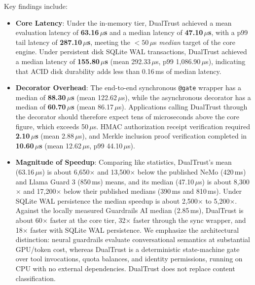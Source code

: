 \documentclass[manuscript, screen, review]{jair}
\begin{document}
Key findings include:
\begin{itemize}[leftmargin=12pt, topsep=2pt, itemsep=1pt]
\item \textbf{Core Latency}: Under the in-memory tier, DualTrust achieved a mean evaluation latency of \textbf{63.16\,$\mu$s} and a median latency of \textbf{47.10\,$\mu$s}, with a p99 tail latency of \textbf{287.10\,$\mu$s}, meeting the $<50\,\mu$s \emph{median} target of the core engine. Under persistent disk SQLite WAL transactions, DualTrust achieved a median latency of \textbf{155.80\,$\mu$s} (mean 292.33\,$\mu$s, p99 1,086.90\,$\mu$s), indicating that ACID disk durability adds less than 0.16\,ms of median latency.
\item \textbf{Decorator Overhead}: The end-to-end synchronous \texttt{@gate} wrapper has a median of \textbf{88.30\,$\mu$s} (mean 122.62\,$\mu$s), while the asynchronous decorator has a median of \textbf{60.70\,$\mu$s} (mean 86.17\,$\mu$s). Applications calling DualTrust through the decorator should therefore expect tens of microseconds above the core figure, which exceeds 50\,$\mu$s. HMAC authorization receipt verification required \textbf{2.10\,$\mu$s} (mean 2.88\,$\mu$s), and Merkle inclusion proof verification completed in \textbf{10.60\,$\mu$s} (mean 12.62\,$\mu$s, p99 44.10\,$\mu$s).
\item \textbf{Magnitude of Speedup}: Comparing like statistics, DualTrust's mean (63.16\,$\mu$s) is about 6,650$\times$ and 13,500$\times$ below the published NeMo (420\,ms) and Llama Guard 3 (850\,ms) means, and its median (47.10\,$\mu$s) is about 8,300$\times$ and 17,200$\times$ below their published medians (390\,ms and 810\,ms). Under SQLite WAL persistence the median speedup is about 2,500$\times$ to 5,200$\times$. Against the locally measured Guardrails AI median (2.85\,ms), DualTrust is about 60$\times$ faster at the core tier, 32$\times$ faster through the sync wrapper, and 18$\times$ faster with SQLite WAL persistence. We emphasize the architectural distinction: neural guardrails evaluate conversational semantics at substantial GPU/token cost, whereas DualTrust is a deterministic state-machine gate over tool invocations, quota balances, and identity permissions, running on CPU with no external dependencies. DualTrust does not replace content classification.
\end{itemize}
\end{document}
